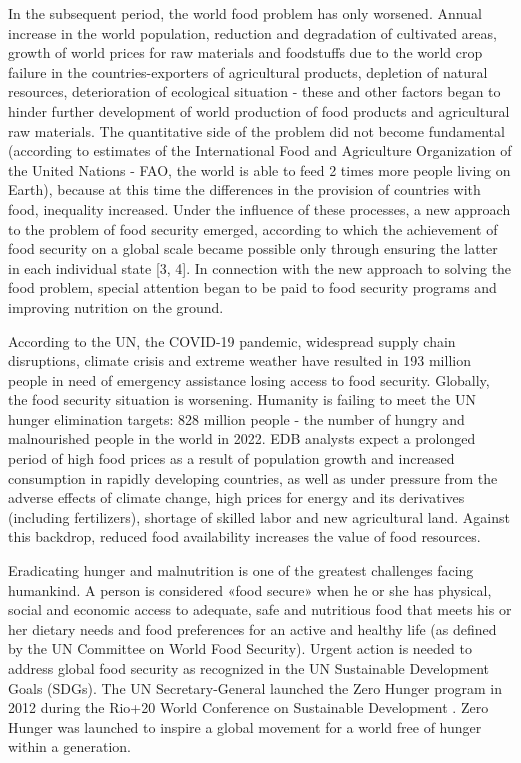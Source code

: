 {In the subsequent period, the world food problem has only worsened.
Annual increase in the world population, reduction and degradation of
cultivated areas, growth of world prices for raw materials and
foodstuffs due to the world crop failure in the countries-exporters of
agricultural products, depletion of natural resources, deterioration of
ecological situation - these and other factors began to hinder further
development of world production of food products and agricultural raw
materials. The quantitative side of the problem did not become
fundamental (according to estimates of the International Food and
Agriculture Organization of the United Nations - FAO, the world is able
to feed 2 times more people living on Earth), because at this time the
differences in the provision of countries with food, inequality
increased. Under the influence of these processes, a new approach to the
problem of food security emerged, according to which the achievement of
food security on a global scale became possible only through ensuring
the latter in each individual state {[}3, 4{]}. In connection with the
new approach to solving the food problem, special attention began to be
paid to food security programs and improving nutrition on the ground.

According to the UN, the COVID-19 pandemic, widespread supply chain
disruptions, climate crisis and extreme weather have resulted in 193
million people in need of emergency assistance losing access to food
security. Globally, the food security situation is worsening. Humanity
is failing to meet the UN hunger elimination targets: 828 million people
- the number of hungry and malnourished people in the world in 2022. EDB
analysts expect a prolonged period of high food prices as a result of
population growth and increased consumption in rapidly developing
countries, as well as under pressure from the adverse effects of climate
change, high prices for energy and its derivatives (including
fertilizers), shortage of skilled labor and new agricultural land.
Against this backdrop, reduced food availability increases the value of
food resources.

Eradicating hunger and malnutrition is one of the greatest challenges
facing humankind. A person is considered «food secure» when he or she
has physical, social and economic access to adequate, safe and
nutritious food that meets his or her dietary needs and food preferences
for an active and healthy life (as defined by the UN Committee on World
Food Security). Urgent action is needed to address global food security
as recognized in the UN Sustainable Development Goals (SDGs). The UN
Secretary-General launched the Zero Hunger program in 2012 during the
Rio+20 World Conference on Sustainable Development . Zero Hunger was
launched to inspire a global movement for a world free of hunger within
a generation.

}
